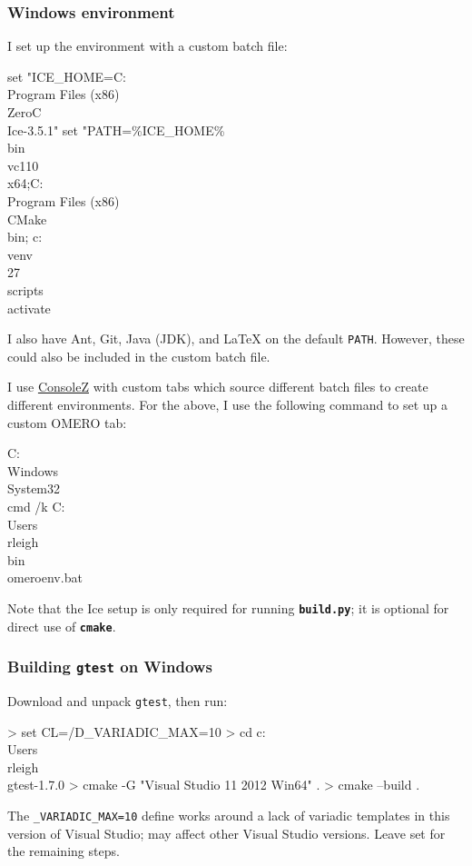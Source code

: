 \documentclass{beamer}
\newcommand{\cmd}[1]{\textbf{\texttt{#1}}}
\newcommand{\pkg}[1]{\texttt{#1}}
\newcommand{\env}[1]{\texttt{#1}}
\begin{document}
\begin{frame}[fragile]
  \frametitle{Windows environment}
  \scriptsize
  I set up the environment with a custom batch file:

  \begin{semiverbatim}
set "ICE_HOME=C:\\Program Files (x86)\\ZeroC\\Ice-3.5.1"
set "PATH=\%ICE_HOME\%\\bin\\vc110\\x64;C:\\Program Files (x86)\\CMake\\bin;%
c:\\venv\\27\\scripts\\activate
\end{semiverbatim}

I also have Ant, Git, Java (JDK), and LaTeX on the default \env{PATH}.
However, these could also be included in the custom batch file.

I use
\href{https://github.com/cbucher/console/wiki/Downloads}{ConsoleZ}
with custom tabs which source different batch files to create
different environments.  For the above, I use the following command to
set up a custom OMERO tab:

  \begin{semiverbatim}
C:\\Windows\\System32\\cmd /k C:\\Users\\rleigh\\bin\\omeroenv.bat
\end{semiverbatim}

Note that the Ice setup is only required for running \cmd{build.py};
it is optional for direct use of \cmd{cmake}.
\end{frame}

\begin{frame}[fragile]
  \frametitle{Building \pkg{gtest} on Windows}
  \scriptsize
  Download and unpack \pkg{gtest}, then run:

  \begin{semiverbatim}
> set CL=/D_VARIADIC_MAX=10
> cd c:\\Users\\rleigh\\gtest-1.7.0
> cmake -G "Visual Studio 11 2012 Win64" .
> cmake --build .
\end{semiverbatim}

The \texttt{\_VARIADIC\_MAX=10} define works around a lack of
variadic templates in this version of Visual Studio; may affect other
Visual Studio versions.  Leave set for the remaining steps.
\end{frame}
\end{document}
